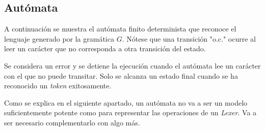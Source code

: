 \documentclass[a4paper]{CSMakotoTechnicalReport}
\begin{document}

    \newpage

    \subsection{Autómata}

    A continuación se muestra el autómata finito determinista que reconoce el lenguaje generado por la gramática $G$. Nótese que una transición "o.c." ocurre al leer un carácter que no corresponda a otra transición del estado.

    Se considera un error y se detiene la ejecución cuando el autómata lee un carácter con el que no puede transitar. Solo se alcanza un estado final cuando se ha reconocido un \textit{token} exitosamente.

    Como se explica en el siguiente apartado, un autómata no va a ser un modelo suficientemente potente como para representar las operaciones de un \textit{Lexer}. Va a ser necesario complementarlo con algo más.

    \vspace{0.02\textheight}
\end{document}
